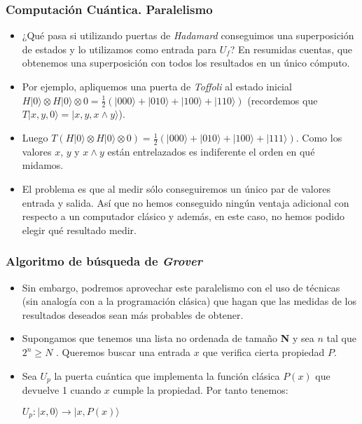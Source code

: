 \documentclass{beamer}
\newcommand{\base}[1]{|#1\rangle}
\begin{document}
\begin{frame}
	\frametitle{Computación Cuántica. Paralelismo}
	\begin{itemize}
	\item ¿Qué pasa si utilizando puertas de \textit{Hadamard} conseguimos una superposición de estados y lo utilizamos como entrada para $U_f$? En resumidas cuentas, que obtenemos una superposición con todos los resultados en un único cómputo.
	\item Por ejemplo, apliquemos una puerta de \textit{Toffoli} al estado inicial $H\base0\otimes H\base0\otimes 0 = \frac{1}{2}(\base{000}+\base{010}+\base{100}+\base{110})$ (recordemos que $T\base{x,y,0}=\base{x,y,x\land y}$).
	\item Luego $T(H\base0\otimes H\base0\otimes 0)=\frac{1}{2}(\base{000}+\base{010}+\base{100}+\base{111})$. Como los valores $x$, $y$ y $x\land y$ están entrelazados es indiferente el orden en qué midamos.
	\item El problema es que al medir sólo conseguiremos un único par de valores entrada y salida. Así que no hemos conseguido ningún ventaja adicional con respecto a un computador clásico y además, en este caso, no hemos podido elegir qué resultado medir.
	\end{itemize}
\end{frame}

\begin{frame}
	\frametitle{Algoritmo de búsqueda de \textit{Grover}}
	\begin{itemize}
	\item Sin embargo, podremos aprovechar este paralelismo con el uso de técnicas (sin analogía con a la programación clásica) que hagan que las medidas de los resultados deseados sean más probables de obtener.
	\item Supongamos que tenemos una lista no ordenada de tamaño \textbf{N} y sea $n$ tal que $2^n \geqslant N$ . Queremos buscar una entrada $x$ que verifica cierta propiedad $P$.
	\item Sea $U_p$ la puerta cuántica que implementa la función clásica $P(x)$ que devuelve 1 cuando $x$ cumple la propiedad. Por tanto tenemos:
	\begin{center}
		$U_p : \base{x,0} \to  \base{x,P(x)}$
	\end{center}
	\end{itemize}
\end{frame}
\end{document}
